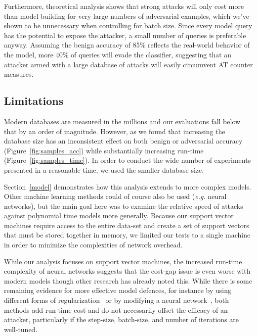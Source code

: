 \documentclass[fonts]{icst}
\begin{document}
Furthermore, theoretical analysis shows that strong attacks will only cost more than model building for very large numbers of adversarial examples, which we've shown to be unnecessary when controlling for batch size. Since every model query has the potential to expose the attacker, a small number of queries is preferable anyway. Assuming the benign accuracy of 85\% reflects the real-world behavior of the model, more 40\% of queries will evade the classifier, suggesting that an attacker armed with a large database of attacks will easily circumvent AT counter measures.

\subsection{Limitations}

Modern databases are measured in the millions and our evaluations fall below that by an order of magnitude. However, as we found that increasing the database size has an inconsistent effect on both benign or adversarial accuracy (Figure~\ref{fig:samples_acc}) while substantially increasing run-time (Figure~\ref{fig:samples_time}). In order to conduct the wide number of experiments presented in a reasonable time, we used the smaller database size.

Section~\ref{model} demonstrates how this analysis extends to more complex models. Other machine learning methods could of course also be used (\textit{e.g.} neural networks), but the main goal here was to examine the relative speed of attacks against polynomial time models more generally.  Because our support vector machines require access to the entire data-set and create a set of support vectors that must be stored together in memory, we limited our tests to a single machine in order to minimize the complexities of network overhead. 

While our analysis focuses on support vector machines, the increased run-time complexity of neural networks suggests that the cost-gap issue is even worse with modern models though other research \cite{meyers2023safety,croce2020reliable} has already noted this. While there is some remaining evidence for more effective model defences, for instance by using different forms of regularization~\cite{jakubovitz2018improving,ross2018improving} or by modifying a neural network~\cite{firenet}, both methods add run-time cost and do not necessarily offset the efficacy of an attacker, particularly if the step-size, batch-size, and number of iterations are well-tuned.
\end{document}
